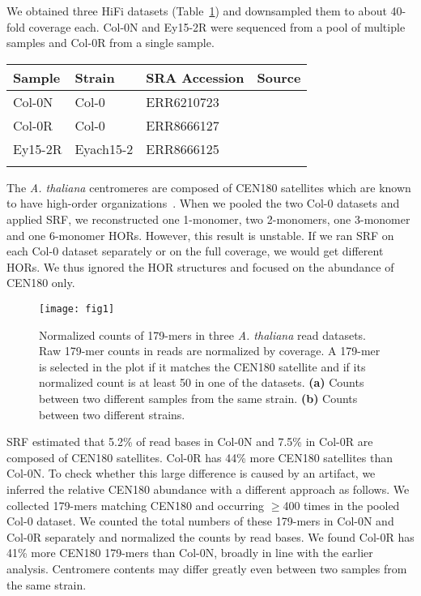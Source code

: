 \documentclass{bioinfo}
\begin{document}
We obtained three HiFi datasets (Table~\ref{tab:at}) and downsampled them to about
40-fold coverage each. Col-0N and Ey15-2R were sequenced from a pool of
multiple samples and Col-0R from a single sample.

\begin{table}[!hb]
{\label{tab:at}
\begin{tabular}{p{1.5cm}p{1.5cm}ll}
\toprule
Sample & Strain & SRA Accession & Source \\
\midrule
Col-0N & Col-0 & ERR6210723 & \citet{Naish:2021aa} \\
Col-0R & Col-0 & ERR8666127 & \citet{Rabanal:2022aa} \\
Ey15-2R & Eyach15-2 & ERR8666125 & \citet{Rabanal:2022aa} \\
\botrule
\end{tabular}}{}
\end{table}

The \emph{A. thaliana} centromeres are composed of CEN180 satellites which are
known to have high-order organizations~\citep{Naish:2021aa}. When we pooled the
two Col-0 datasets and applied SRF, we reconstructed one 1-monomer, two
2-monomers, one 3-monomer and one 6-monomer HORs. However, this result is
unstable. If we ran SRF on each Col-0 dataset separately or on the full
coverage, we would get different HORs. We thus ignored the HOR structures and
focused on the abundance of CEN180 only.

\begin{figure}[!tb]
\texttt{[image: fig1]}
\caption{Normalized counts of 179-mers in three \emph{A. thaliana} read
datasets. Raw 179-mer counts in reads are normalized by coverage. A 179-mer is
selected in the plot if it matches the CEN180 satellite and if its normalized
count is at least 50 in one of the datasets. {\bf (a)} Counts between two
different samples from the same strain. {\bf (b)} Counts between two different
strains.}\label{fig:1}
\end{figure}

SRF estimated that 5.2\% of read bases in Col-0N and 7.5\% in Col-0R are
composed of CEN180 satellites. Col-0R has 44\% more CEN180 satellites than
Col-0N. To check whether this large difference is caused by an artifact, we
inferred the relative CEN180 abundance with a different approach as follows.
We collected 179-mers matching CEN180 and occurring $\ge$400 times in the
pooled Col-0 dataset. We counted the total numbers of these 179-mers in Col-0N
and Col-0R separately and normalized the counts by read bases. We found Col-0R
has 41\% more CEN180 179-mers than Col-0N, broadly in line with the earlier
analysis. Centromere contents may differ greatly even between two samples from
the same strain.
\end{document}

